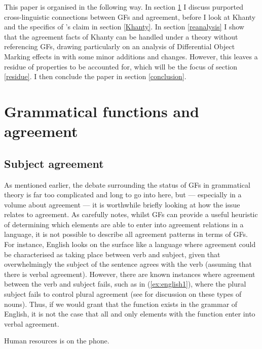 \documentclass[output=paper
,modfonts
,nonflat]{langsci/langscibook}
\begin{document}
This paper is organised in the following way. In section \ref{gfagr} I discuss purported cross-linguistic connections between GFs and agreement, before I look at Khanty and the specifics of \citet{dn2011}'s claim in section \ref{Khanty}.
In section \ref{reanalysis} I show that the agreement facts of Khanty can be handled under a theory without referencing GFs, drawing particularly on an analysis of Differential Object Marking effects in \citet{Baker2015} with some minor additions and changes.
However, this leaves a residue of properties to be accounted for, which will be the focus of section \ref{residue}.
I then conclude the paper in section \ref{conclusion}.


\section{Grammatical functions and agreement}\label{gfagr}

\subsection{Subject agreement}

As mentioned earlier, the debate surrounding the status of GFs in grammatical theory is far too complicated and long to go into here, but --- especially in a volume about agreement --- it is worthwhile briefly looking at how the issue relates to agreement.
As \citet{corbett2012gr} carefully notes, whilst GFs can provide a useful heuristic of determining which elements are able to enter into agreement relations in a language, it is not possible to describe all agreement patterns in terms of GFs.
For instance, English looks on the surface like a language where agreement could be characterised as taking place between verb and subject, given that overwhelmingly the subject of the sentence agrees with the verb (assuming that there is verbal agreement).
However, there are known instances where agreement between the verb and subject fails, such as in (\ref{ex:english1}), where the plural subject fails to control plural agreement (see \citealt{pollardsag1994} for discussion on these types of nouns). 
Thus, if we would grant that the \subj {} function exists in the grammar of English, it is not the case that all and only elements with the \subj {} function enter into verbal agreement.

\begin{exe}
\ex \label{ex:english1}
Human resources is on the phone.
\end{exe}
\end{document}

